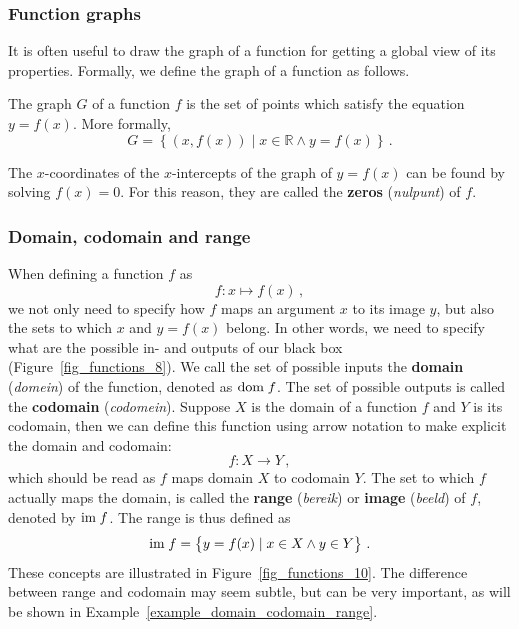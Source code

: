 \subsubsection{Function graphs}
It is often useful to draw the graph of a function for getting a global view of its properties. Formally, we define the graph of a function as follows. 
\begin{definition}
The graph $G$ of a function $f$ is the set of points which satisfy the equation $y=f(x)$. More formally, 
$$
G=\left\{(x,f(x))\mid x \in \mathbb{R} \wedge y=f(x)\right\}\,.
$$
\end{definition}
The $x$-coordinates of the $x$-intercepts of the graph of $y=f(x)$ can be found by solving $f(x) = 0$.  For this reason, they are called the \textbf{zeros} (\textit{nulpunt}) of $f$.


\subsubsection{Domain, codomain and range}
When defining a function $f$ as
$$
f: x\mapsto f(x)\,,
$$
\ifcourse
	\checkoddpage
{}
\fi
we not only need to specify how $f$ maps an argument $x$ to its image $y$, but also the sets to which $x$ and $y=f(x)$ belong. In other words, we need to specify what are the possible in- and outputs of our black box (Figure~\ref{fig_functions_8}). We call the set of possible inputs the \textbf{domain} (\textit{domein}) of the function, denoted as $\text{dom}{\;f}$. The set of possible outputs is called the \textbf{codomain} (\textit{codomein}). Suppose $X$ is the domain of a function $f$ and $Y$ is its codomain, then we can define this function using arrow notation to make explicit the domain and codomain:
$$
f:X\to Y\,,
$$
which should be read as $f$ maps domain $X$ to codomain $Y$. The set to which $f$ actually maps the domain, is called the \textbf{range} (\textit{bereik}) or \textbf{image} (\textit{beeld}) of $f$, denoted by $\text{im}{\;f}$. The range is thus defined as
$$
\text{im}{\;f} = \left\{y=f(x)\mid x\in X \wedge y\in Y \right\}\,.
$$
These concepts are illustrated in Figure~\ref{fig_functions_10}. The difference between range and codomain may seem subtle, but can be very important, as will be shown in Example~\ref{example_domain_codomain_range}.

